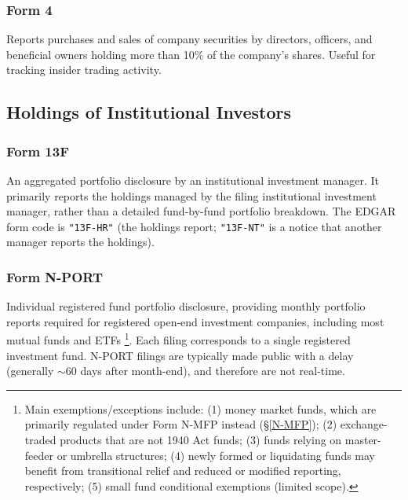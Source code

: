 \documentclass[11pt,a4paper]{report}
\begin{document}
\subsubsection{Form 4}
Reports purchases and sales of company securities by directors, officers, and beneficial owners holding more than 10\% of the company's shares. Useful for tracking insider trading activity.

\subsection{Holdings of Institutional Investors}\label{hii}

\subsubsection{Form 13F}
An aggregated portfolio disclosure by an institutional investment manager. It primarily reports the holdings managed by the filing institutional investment manager, rather than a detailed fund-by-fund portfolio breakdown. The EDGAR form code is \texttt{"13F-HR"} (the holdings report; \texttt{"13F-NT"} is a notice that another manager reports the holdings).

\subsubsection{Form N-PORT}\label{N-PORT}
Individual registered fund portfolio disclosure, providing monthly portfolio reports required for registered open-end investment companies, including most mutual funds and ETFs \footnote{Main exemptions/exceptions include: (1) money market funds, which are primarily regulated under Form N-MFP instead (\S\ref{N-MFP}); (2) exchange-traded products that are not 1940 Act funds; (3) funds relying on master-feeder or umbrella structures; (4) newly formed or liquidating funds may benefit from transitional relief and reduced or modified reporting, respectively; (5) small fund conditional exemptions (limited scope).}. Each filing corresponds to a single registered investment fund. N-PORT filings are typically made public with a delay (generally $\sim$60 days after month-end), and therefore are not real-time.
\end{document}
